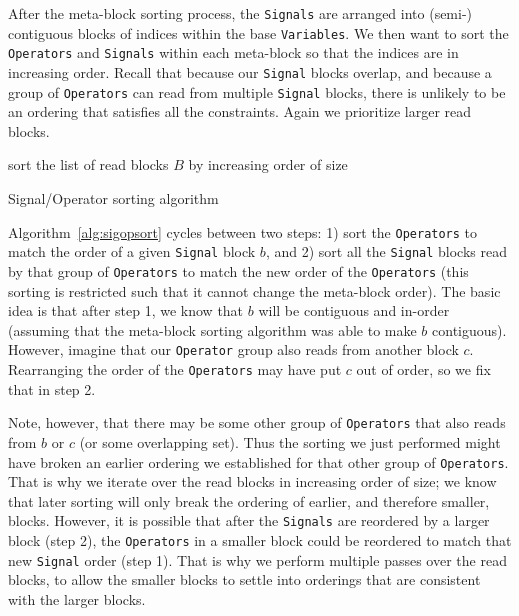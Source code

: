 \documentclass{article}
\begin{document}
After the meta-block sorting process, the \texttt{Signals} are arranged into (semi-) contiguous blocks of indices within the base \texttt{Variables}.  We then want to sort the \texttt{Operators} and \texttt{Signals} within each meta-block so that the indices are in increasing order.  Recall that because our \texttt{Signal} blocks overlap, and because a group of \texttt{Operators} can read from multiple \texttt{Signal} blocks, there is unlikely to be an ordering that satisfies all the constraints.  Again we prioritize larger read blocks.

\begin{algorithm}
\DontPrintSemicolon
sort the list of read blocks $B$ by increasing order of size\;
\caption{Signal/Operator sorting algorithm}
\label{alg:sigopsort}
\end{algorithm}

Algorithm~\ref{alg:sigopsort} cycles between two steps: 1) sort the \texttt{Operators} to match the order of a given \texttt{Signal} block $b$, and 2) sort all the \texttt{Signal} blocks read by that group of \texttt{Operators} to match the new order of the \texttt{Operators} (this sorting is restricted such that it cannot change the meta-block order).  The basic idea is that after step 1, we know that $b$ will be contiguous and in-order (assuming that the meta-block sorting algorithm was able to make $b$ contiguous).  However, imagine that our \texttt{Operator} group also reads from another block $c$.  Rearranging the order of the \texttt{Operators} may have put $c$ out of order, so we fix that in step 2.  

Note, however, that there may be some other group of \texttt{Operators} that also reads from $b$ or $c$ (or some overlapping set).  Thus the sorting we just performed might have broken an earlier ordering we established for that other group of \texttt{Operators}.  That is why we iterate over the read blocks in increasing order of size; we know that later sorting will only break the ordering of earlier, and therefore smaller, blocks.  However, it is possible that after the \texttt{Signals} are reordered by a larger block (step 2), the \texttt{Operators} in a smaller block could be reordered to match that new \texttt{Signal} order (step 1).  That is why we perform multiple passes over the read blocks, to allow the smaller blocks to settle into orderings that are consistent with the larger blocks.
\end{document}

